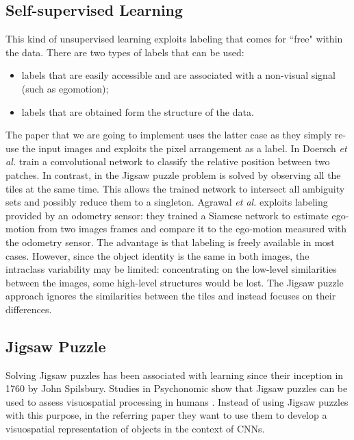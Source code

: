 \subsection{Self-supervised Learning}
This kind of unsupervised learning exploits labeling that comes for \textquotedblleft free" within the data. There are two types of labels that can be used:
\begin{itemize}
    \item labels that are easily accessible and are associated with a non-visual signal (such as egomotion);
    \item labels that are obtained form the structure of the data.
\end{itemize}
The paper that we are going to implement uses the latter case as they simply re-use the input images and exploits the pixel arrangement as a label.\newline
In \cite{context_prediction} Doersch \textit{et al.} train a convolutional network to classify the relative position between two patches. In contrast, in \cite{Noroozi_2016} the Jigsaw puzzle problem is solved by observing all the tiles at the same time. This allows the trained network to intersect all ambiguity sets and possibly reduce them to a singleton.
Agrawal \textit{et al.} \cite{learning_by_moving} exploits labeling provided by an odometry sensor: they trained a Siamese network to estimate ego-motion from two images frames and compare it to the ego-motion measured with the odometry sensor. The advantage is that labeling is freely available in most cases. However, since the object identity is the same in both images, the intraclass variability may be limited: concentrating on the low-level similarities between the images, some high-level structures would be lost. The Jigsaw puzzle approach ignores the similarities between the tiles and instead focuses on their differences.

\subsection{Jigsaw Puzzle}
Solving Jigsaw puzzles has been associated with learning since their inception in 1760 by John Spilsbury. Studies in Psychonomic show that Jigsaw puzzles can be used to assess visuospatial processing in humans \cite{assessing_visuospatial_processes}. Instead of using Jigsaw puzzles with this purpose, in the referring paper they want to use them to develop a visuospatial representation of objects in the context of CNNs.
